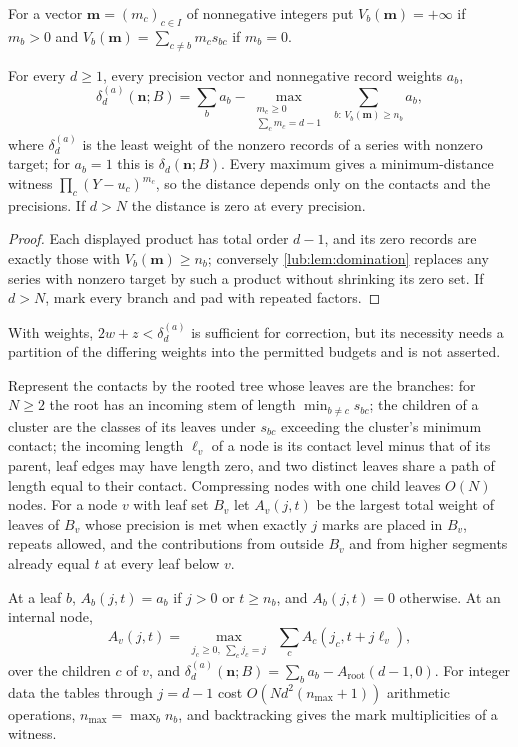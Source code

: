 For a vector $\mathbf m=(m_c)_{c\in I}$ of nonnegative integers put $V_b(\mathbf m)=+\infty$ if $m_b>0$
and $V_b(\mathbf m)=\sum_{c\ne b}m_cs_{bc}$ if $m_b=0$.

\begin{theorem}\label{lub:thm:products}
For every $d\ge1$, every precision vector and nonnegative record weights $a_b$,
\[
 \delta^{(a)}_d(\mathbf n;B)=\sum_ba_b-\max_{\substack{m_c\ge0\\\sum_cm_c=d-1}}\ \sum_{b:\,V_b(\mathbf m)\ge n_b}a_b,
\]
where $\delta^{(a)}_d$ is the least weight of the nonzero records of a series with nonzero target; for
$a_b=1$ this is $\delta_d(\mathbf n;B)$. Every maximum gives a minimum-distance witness
$\prod_c(Y-u_c)^{m_c}$, so the distance depends only on the contacts and the precisions. If $d>N$ the
distance is zero at every precision.
\end{theorem}

\begin{proof}
Each displayed product has total order $d-1$, and its zero records are exactly those with
$V_b(\mathbf m)\ge n_b$; conversely \cref{lub:lem:domination} replaces any series with nonzero target by
such a product without shrinking its zero set. If $d>N$, mark every branch and pad with repeated
factors.
\end{proof}

With weights, $2w+z<\delta_d^{(a)}$ is sufficient for correction, but its necessity needs a partition of
the differing weights into the permitted budgets and is not asserted.

Represent the contacts by the rooted tree whose leaves are the branches: for $N\ge2$ the root has an
incoming stem of length $\min_{b\ne c}s_{bc}$; the children of a cluster are the classes of
its leaves under $s_{bc}$ exceeding the cluster's minimum contact; the incoming length
$\ell_v$ of a node is its contact level minus that of its parent, leaf edges may have length
zero, and two distinct leaves share a path of length equal to their contact. Compressing nodes with
one child leaves $O(N)$ nodes. For a node $v$ with leaf set $B_v$ let $A_v(j,t)$ be the largest total
weight of leaves of $B_v$ whose precision is met when exactly $j$ marks are placed in $B_v$, repeats
allowed, and the contributions from outside $B_v$ and from higher segments already equal $t$ at every
leaf below $v$.

\begin{theorem}\label{lub:thm:marks}
At a leaf $b$, $A_b(j,t)=a_b$ if $j>0$ or $t\ge n_b$, and $A_b(j,t)=0$ otherwise. At an internal node,
\[
 A_v(j,t)=\max_{\substack{j_c\ge0,\ \sum_cj_c=j}}\ \sum_cA_c(j_c,t+j\ell_v),
\]
over the children $c$ of $v$, and $\delta_d^{(a)}(\mathbf n;B)=\sum_ba_b-A_{\mathrm{root}}(d-1,0)$. For
integer data the tables through $j=d-1$ cost $O(Nd^2(n_{\max}+1))$ arithmetic operations,
$n_{\max}=\max_bn_b$, and backtracking gives the mark multiplicities of a witness.
\end{theorem}

